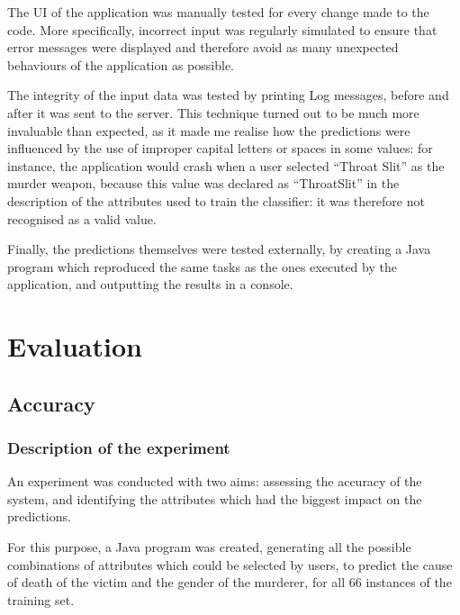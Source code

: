 \documentclass{mproj}
\begin{document}
The UI of the application was manually tested for every change made to the code. More specifically, incorrect input was regularly simulated to ensure that error messages were displayed and therefore avoid as many unexpected behaviours of the application as possible.

The integrity of the input data was tested by printing Log messages, before and after it was sent to the server. This technique turned out to be much more invaluable than expected, as it made me realise how the predictions were influenced by the use of improper capital letters or spaces in some values: for instance, the application would crash when a user selected ``Throat Slit'' as the murder weapon, because this value was declared as ``ThroatSlit'' in the description of the attributes used to train the classifier: it was therefore not recognised as a valid value. 

Finally, the predictions themselves were tested externally, by creating a Java program which reproduced the same tasks as the ones executed by the application, and outputting the results in a console. 

\chapter{Evaluation}\label{evaluation}

\section{Accuracy}

\subsection*{Description of the experiment}

An experiment was conducted with two aims: assessing the accuracy of the system, and identifying the attributes which had the biggest impact on the predictions. 

For this purpose, a Java program was created, generating all the possible combinations of attributes which could be selected by users, to predict the cause of death of the victim and the gender of the murderer, for all 66 instances of the training set.
\end{document}
